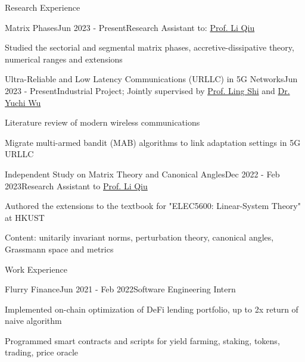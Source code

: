 \documentclass{resume}
\begin{document}
\begin{rSection}{Research Experience}

    \begin{rSubsection}{Matrix Phases}{Jun 2023 - Present}{Research Assistant to: \href{https://eeqiu.people.ust.hk/}{Prof. Li Qiu}}{}
        \item Studied the sectorial and segmental matrix phases, accretive-dissipative theory, numerical ranges and extensions
    \end{rSubsection}

    \begin{rSubsection}{Ultra-Reliable and Low Latency Communications (URLLC) in 5G Networks}{Jun 2023 - Present}{Industrial Project; Jointly supervised by \href{https://eesling.home.ece.ust.hk/}{Prof. Ling Shi} and \href{https://ieeexplore.ieee.org/author/37086153473}{Dr. Yuchi Wu}}{}
        \item Literature review of modern wireless communications
        \item Migrate multi-armed bandit (MAB) algorithms to link adaptation settings in 5G URLLC
    \end{rSubsection}

    \begin{rSubsection}{Independent Study on Matrix Theory and Canonical Angles}{Dec 2022 - Feb 2023}{Research Assistant to \href{https://eeqiu.people.ust.hk/}{Prof. Li Qiu}}{}
        \item Authored the extensions to the textbook for "ELEC5600: Linear-System Theory" at HKUST
        \item Content: unitarily invariant norms, perturbation theory, canonical angles, Grassmann space and metrics
    \end{rSubsection}

\end{rSection}

\begin{rSection}{Work Experience}

    \begin{rSubsection}{Flurry Finance}{Jun 2021 - Feb 2022}{Software Engineering Intern}{}
        \item Implemented on-chain optimization of DeFi lending portfolio, up to 2x return of naive algorithm
        \item Programmed smart contracts and scripts for yield farming, staking, tokens, trading, price oracle
    \end{rSubsection}

\end{rSection}
\end{document}
